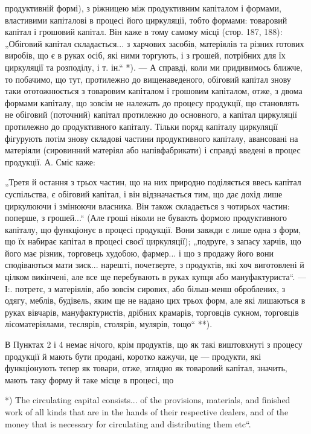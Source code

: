 продуктивній формі), з ріжницею між продуктивним капіталом і формами,
властивими капіталові в процесі його циркуляції, тобто формами: товаровий
капітал і грошовий капітал. Він каже в тому самому місці (стор.
187, 188): „Обіговий капітал складається... з харчових засобів, матеріялів
та різних готових виробів, що є в руках осіб, які ними торгують, і з
грошей, потрібних для їх циркуляції та розподілу, і т. ін.“ *). — А справді,
коли ми придивимось ближче, то побачимо, що тут, протилежно до вищенаведеного,
обіговий капітал знову таки ототожнюється з товаровим
капіталом і грошовим капіталом, отже, з двома формами капіталу, що зовсім
не належать до процесу продукції, що становлять не обіговий (поточний)
капітал протилежно до основного, а капітал циркуляції протилежно до продуктивного
капіталу. Тільки поряд капіталу циркуляції фігурують потім
знову складові частини продуктивного капіталу, авансовані на матеріяли
(сировинний матеріял або напівфабрикати) і справді введені в процес продукції.
А. Сміс каже:

„Третя й остання з трьох частин, що на них природно поділяється
ввесь капітал суспільства, є обіговий капітал, і він відзначається тим, що
дає дохід лише циркулюючи і змінюючи власника. Він також складається
з чотирьох частин: поперше, з грошей...“ (Але гроші ніколи не
бувають формою продуктивного капіталу, що функціонує в процесі продукції.
Вони завжди є лише одна з форм, що їх набирає капітал в процесі
своєї циркуляції); „подруге, з запасу харчів, що його має різник,
торговець худобою, фармер... і що з продажу його вони сподіваються
мати зиск... нарешті, почетверте, з продуктів, які хоч виготовлені й цілком
викінчені, але все ще перебувають в руках купця або мануфактуриста“.
— І:. потретє, з матеріялів, або зовсім сирових, або більш-менш
оброблених, з одягу, меблів, будівель, яким ще не надано цих трьох
форм, але які лишаються в руках вівчарів, мануфактуристів, дрібних
крамарів, торговців сукном, торговців лісоматеріялами, теслярів, столярів,
мулярів, тощо“ **).

В Пунктах 2 і 4 немає нічого, крім продуктів, що як такі виштовхнуті
з процесу продукції й мають бути продані, коротко кажучи,
це — продукти, які функціонують тепер як товари, отже, зглядно як товаровий
капітал, значить, мають таку форму й таке місце в процесі, що

*) The circulating capital consists... of the provisions, materials, and finished work
of all kinds that are in the hands of their respective dealers, and of the money
that is necessary for circulating and distributing them etc“.

